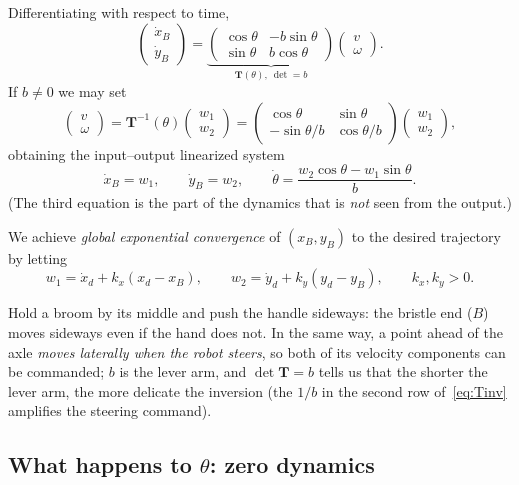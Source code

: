 \documentclass[11pt,a4paper]{article}
\newcommand{\vect}[1]{\bm{#1}}
\theoremstyle{plain}
\theoremstyle{definition}
\theoremstyle{remark}
\begin{document}
Differentiating with respect to time,
\[
\begin{pmatrix}\dot x_B\\\dot y_B\end{pmatrix}=\underbrace{\begin{pmatrix}\cos\theta&-b\sin\theta\\\sin\theta&b\cos\theta\end{pmatrix}}_{\vect T(\theta),\ \det=b}\begin{pmatrix}v\\\omega\end{pmatrix}.
\]
If $b\neq0$ we may set
\begin{equation}\label{eq:Tinv}
\begin{pmatrix}v\\\omega\end{pmatrix}=\vect T^{-1}(\theta)\begin{pmatrix}w_1\\w_2\end{pmatrix}=\begin{pmatrix}\cos\theta&\sin\theta\\-\sin\theta/b&\cos\theta/b\end{pmatrix}\begin{pmatrix}w_1\\w_2\end{pmatrix},
\end{equation}
obtaining the input--output linearized system
\[
\dot x_B=w_1,\qquad \dot y_B=w_2,\qquad \dot\theta=\frac{w_2\cos\theta-w_1\sin\theta}{b}.
\]
(The third equation is the part of the dynamics that is \emph{not} seen from the output.)

We achieve \emph{global exponential convergence} of $(x_B,y_B)$ to the desired trajectory by letting
\[
w_1=\dot x_d+k_x(x_d-x_B),\qquad w_2=\dot y_d+k_y(y_d-y_B),\qquad k_x,k_y>0 .
\]

\begin{intuition}
Hold a broom by its middle and push the handle sideways: the bristle end ($B$) moves sideways even if the hand does not. In the same way, a point ahead of the axle \emph{moves laterally when the robot steers}, so both of its velocity components can be commanded; $b$ is the lever arm, and $\det\vect T=b$ tells us that the shorter the lever arm, the more delicate the inversion (the $1/b$ in the second row of~\eqref{eq:Tinv} amplifies the steering command).
\end{intuition}

\subsection{What happens to $\theta$: zero dynamics}
\end{document}
